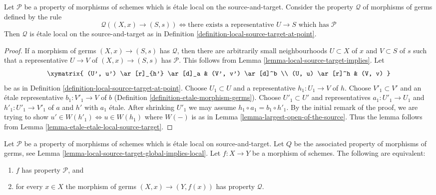 \begin{lemma}
\label{lemma-local-source-target-global-implies-local}
Let $\mathcal{P}$ be a property of morphisms of schemes
which is \'etale local on the source-and-target.
Consider the property $\mathcal{Q}$ of
morphisms of germs defined by the rule
$$
\mathcal{Q}((X, x) \to (S, s))
\Leftrightarrow
\text{there exists a representative }U \to S
\text{ which has }\mathcal{P}
$$
Then $\mathcal{Q}$ is \'etale local on the source-and-target as in
Definition \ref{definition-local-source-target-at-point}.
\end{lemma}

\begin{proof}
If a morphism of germs $(X, x) \to (S, s)$ has $\mathcal{Q}$,
then there are arbitrarily small neighbourhoods
$U \subset X$ of $x$ and $V \subset S$ of $s$
such that a representative $U \to V$ of $(X, x) \to (S, s)$ has $\mathcal{P}$.
This follows from Lemma \ref{lemma-local-source-target-implies}. Let
$$
\xymatrix{
(U', u') \ar[r]_{h'} \ar[d]_a & (V', v') \ar[d]^b \\
(U, u) \ar[r]^h & (V, v)
}
$$
be as in Definition \ref{definition-local-source-target-at-point}.
Choose $U_1 \subset U$ and a representative $h_1 : U_1 \to V$ of $h$.
Choose $V'_1 \subset V'$ and an \'etale representative $b_1 : V'_1 \to V$
of $b$ (Definition \ref{definition-etale-morphism-germs}).
Choose $U'_1 \subset U'$ and representatives $a_1 : U'_1 \to U_1$
and $h'_1 : U'_1 \to V'_1$ of $a$ and $h'$ with $a_1$ \'etale.
After shrinking $U'_1$ we may assume $h_1 \circ a_1 = b_1 \circ h'_1$.
By the initial remark of the proof, we are trying to show
$u' \in W(h'_1) \Leftrightarrow u \in W(h_1)$ where $W(-)$ is as
in Lemma \ref{lemma-largest-open-of-the-source}.
Thus the lemma follows from Lemma \ref{lemma-etale-etale-local-source-target}.
\end{proof}

\begin{lemma}
\label{lemma-local-source-target-local-implies-global}
Let $\mathcal{P}$ be a property of morphisms of schemes which is
\'etale local on source-and-target. Let $Q$ be the associated property
of morphisms of germs, see
Lemma \ref{lemma-local-source-target-global-implies-local}.
Let $f : X \to Y$ be a morphism
of schemes. The following are equivalent:
\begin{enumerate}
\item $f$ has property $\mathcal{P}$, and
\item for every $x \in X$ the morphism of germs $(X, x) \to (Y, f(x))$
has property $\mathcal{Q}$.
\end{enumerate}
\end{lemma}

